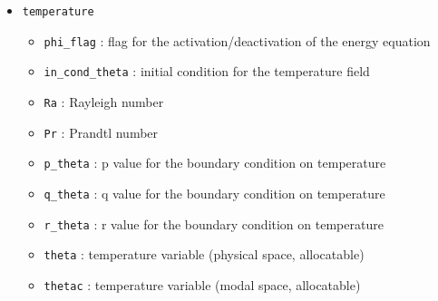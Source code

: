 \begin{itemize}
\item \texttt{temperature}
\begin{itemize}
\item \texttt{phi\_flag} : flag for the activation/deactivation of the energy equation
\item \texttt{in\_cond\_theta} : initial condition for the temperature field
\item \texttt{Ra} : Rayleigh number 
\item \texttt{Pr} : Prandtl number
\item \texttt{p\_theta} : p value for the boundary condition on temperature
\item \texttt{q\_theta} : q value for the boundary condition on temperature
\item \texttt{r\_theta} : r value for the boundary condition on temperature
\item \texttt{theta} : temperature variable (physical space, allocatable)
\item \texttt{thetac} : temperature variable (modal space, allocatable)
\end{itemize}



\end{itemize}
